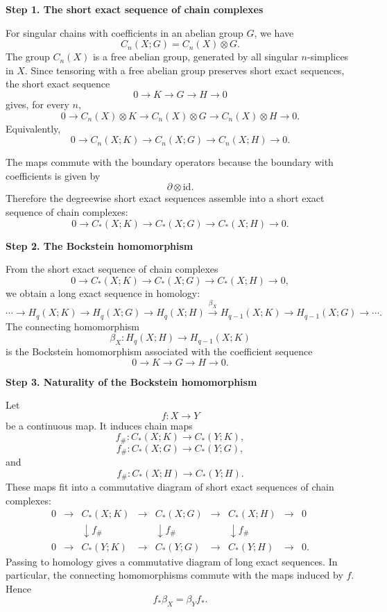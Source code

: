 \begin{solution}

\medskip
\noindent\textbf{Step 1. The short exact sequence of chain complexes}\par
\smallskip


For singular chains with coefficients in an abelian group \(G\), we have
\[
C_n(X;G)=C_n(X)\otimes G.
\]
The group \(C_n(X)\) is a free abelian group, generated by all singular \(n\)-simplices in \(X\). Since tensoring with a free abelian group preserves short exact sequences, the short exact sequence
\[
0\longrightarrow K\longrightarrow G\longrightarrow H\longrightarrow 0
\]
gives, for every \(n\),
\[
0\longrightarrow C_n(X)\otimes K
\longrightarrow C_n(X)\otimes G
\longrightarrow C_n(X)\otimes H
\longrightarrow 0.
\]
Equivalently,
\[
0\longrightarrow C_n(X;K)
\longrightarrow C_n(X;G)
\longrightarrow C_n(X;H)
\longrightarrow 0.
\]

The maps commute with the boundary operators because the boundary with coefficients is given by
\[
\partial\otimes \mathrm{id}.
\]
Therefore the degreewise short exact sequences assemble into a short exact sequence of chain complexes:
\[
\boxed{
	0\longrightarrow C_*(X;K)
	\longrightarrow C_*(X;G)
	\longrightarrow C_*(X;H)
	\longrightarrow 0.
}
\]


\medskip
\noindent\textbf{Step 2. The Bockstein homomorphism}\par
\smallskip


From the short exact sequence of chain complexes
\[
0\longrightarrow C_*(X;K)
\longrightarrow C_*(X;G)
\longrightarrow C_*(X;H)
\longrightarrow 0,
\]
we obtain a long exact sequence in homology:
\[
\cdots
\longrightarrow
H_q(X;K)
\longrightarrow
H_q(X;G)
\longrightarrow
H_q(X;H)
\xrightarrow{\beta_X}
H_{q-1}(X;K)
\longrightarrow
H_{q-1}(X;G)
\longrightarrow
\cdots .
\]
The connecting homomorphism
\[
\beta_X:H_q(X;H)\longrightarrow H_{q-1}(X;K)
\]
is the Bockstein homomorphism associated with the coefficient sequence
\[
0\longrightarrow K\longrightarrow G\longrightarrow H\longrightarrow 0.
\]


\medskip
\noindent\textbf{Step 3. Naturality of the Bockstein homomorphism}\par
\smallskip


Let
\[
f:X\longrightarrow Y
\]
be a continuous map. It induces chain maps
\[
f_\#:C_*(X;K)\longrightarrow C_*(Y;K),
\]
\[
f_\#:C_*(X;G)\longrightarrow C_*(Y;G),
\]
and
\[
f_\#:C_*(X;H)\longrightarrow C_*(Y;H).
\]
These maps fit into a commutative diagram of short exact sequences of chain complexes:
\[
\begin{array}{ccccccccc}
	0 &\longrightarrow& C_*(X;K) &\longrightarrow& C_*(X;G) &\longrightarrow& C_*(X;H) &\longrightarrow& 0 \\[1mm]
	&& \downarrow f_\# && \downarrow f_\# && \downarrow f_\# && \\[1mm]
	0 &\longrightarrow& C_*(Y;K) &\longrightarrow& C_*(Y;G) &\longrightarrow& C_*(Y;H) &\longrightarrow& 0 .
\end{array}
\]
Passing to homology gives a commutative diagram of long exact sequences. In particular, the connecting homomorphisms commute with the maps induced by \(f\). Hence
\[
\boxed{
	f_*\beta_X=\beta_Y f_*.
}
\]


\end{solution}
